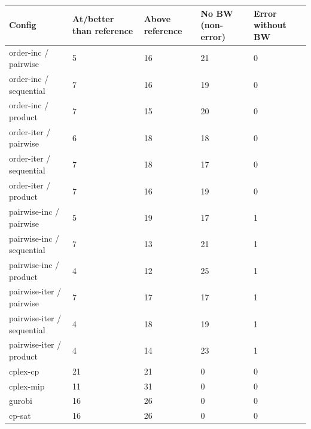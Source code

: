 \begin{tabular}{lllll}
\hline
Config & At/better than reference & Above reference & No BW (non-error) & Error without BW \\
\hline
order-inc / pairwise & 5 & 16 & 21 & 0 \\
order-inc / sequential & 7 & 16 & 19 & 0 \\
order-inc / product & 7 & 15 & 20 & 0 \\
order-iter / pairwise & 6 & 18 & 18 & 0 \\
order-iter / sequential & 7 & 18 & 17 & 0 \\
order-iter / product & 7 & 16 & 19 & 0 \\
pairwise-inc / pairwise & 5 & 19 & 17 & 1 \\
pairwise-inc / sequential & 7 & 13 & 21 & 1 \\
pairwise-inc / product & 4 & 12 & 25 & 1 \\
pairwise-iter / pairwise & 7 & 17 & 17 & 1 \\
pairwise-iter / sequential & 4 & 18 & 19 & 1 \\
pairwise-iter / product & 4 & 14 & 23 & 1 \\
cplex-cp & 21 & 21 & 0 & 0 \\
cplex-mip & 11 & 31 & 0 & 0 \\
gurobi & 16 & 26 & 0 & 0 \\
cp-sat & 16 & 26 & 0 & 0 \\
\hline
\end{tabular}

